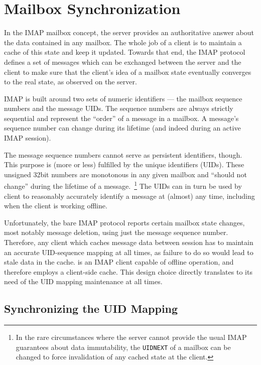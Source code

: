 
\section{Mailbox Synchronization}

In the IMAP mailbox concept, the server provides an authoritative answer about the data contained in any mailbox.  The
whole job of a client is to maintain a cache of this state and keep it updated.  Towards that end, the IMAP protocol
defines a set of messages which can be exchanged between the server and the client to make sure that the client's idea
of a mailbox state eventually converges to the real state, as observed on the server.

IMAP is built around two sets of numeric identifiers --- the mailbox sequence numbers and the message UIDs.  The
sequence numbers are always strictly sequential and represent the ``order'' of a message in a mailbox.  A message's
sequence number can change during its lifetime (and indeed during an active IMAP session).

The message sequence numbers cannot serve as persistent identifiers, though.  This purpose is (more or less) fulfilled
by the unique identifiers (UIDs).  These unsigned 32bit numbers are monotonous in any given mailbox and ``should not
change'' during the lifetime of a message.~\footnote{In the rare circumstances where the server cannot provide the usual
IMAP guarantees about data immutability, the {\tt UIDNEXT} of a mailbox can be changed to force invalidation of any
cached state at the client.}  The UIDs can in turn be used by client to reasonably accurately identify a message at
(almost) any time, including when the client is working offline.

Unfortunately, the bare IMAP protocol reports certain mailbox state changes, most notably message deletion, using just
the message sequence number.  Therefore, any client which caches message data between session has to maintain an
accurate UID-sequence mapping at all times, as failure to do so would lead to stale data in the cache.  \trojita is an
IMAP client capable of offline operation, and therefore employs a client-side cache.  This design choice directly
translates to its need of the UID mapping maintenance at all times.

\subsection{Synchronizing the UID Mapping}


